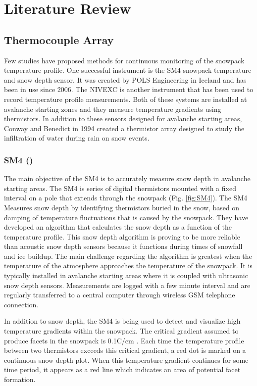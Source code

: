 \chapter{Literature Review}
\section{Thermocouple Array}
Few studies have proposed methods for continuous monitoring of the snowpack temperature profile. One successful instrument is the SM4 snowpack temperature and snow depth sensor. It was created by POLS Engineering in Iceland and has been in use since 2006. The NIVEXC is another instrument that has been used to record temperature profile measurements. Both of these systems are installed at avalanche starting zones and they measure temperature gradients using thermistors. In addition to these sensors designed for avalanche starting areas, Conway and Benedict in 1994 created a thermistor array designed to study the infiltration of water during rain on snow events. 

\subsection{SM4 (\cite{ingolfsson2008sm4})}  The main objective of the SM4 is to accurately measure snow depth in avalanche starting areas. The SM4 is series of digital thermistors mounted with a fixed interval on a pole that extends through the snowpack (Fig. \ref{fig:SM4}). The SM4 Measures snow depth by identifying thermistors buried in the snow, based on damping of temperature fluctuations that is caused by the snowpack. They have developed an algorithm that calculates the snow depth as a function of the temperature profile. This snow depth algorithm is proving to be more reliable than acoustic snow depth sensors because it functions during times of snowfall and ice buildup. The main challenge regarding the algorithm is greatest when the temperature of the atmosphere approaches the temperature of the snowpack. It is typically installed in avalanche starting areas where it is coupled with ultrasonic snow depth sensors. Measurements are logged with a few minute interval and are regularly transferred to a central computer through wireless GSM telephone connection.

In addition to snow depth, the SM4 is being used to detect and visualize high temperature gradients within the snowpack. The critical gradient assumed to produce facets in the snowpack is 0.1\textdegree C/cm \cite{mcclung_schaerer_2009}. Each time the temperature profile between two thermistors exceeds this critical gradient, a red dot is marked on a continuous snow depth plot. When this temperature gradient continues for some time period, it appears as a red line which indicates an area of potential facet formation. 

